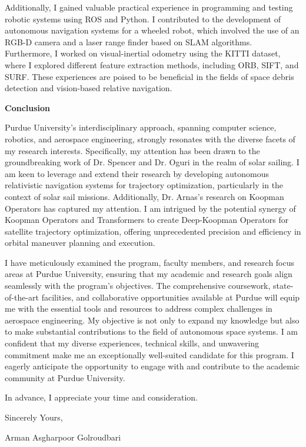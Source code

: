 \documentclass[a4,20pt]{article}
\begin{document}
\begin{large}
Additionally, I gained valuable practical experience in programming and testing robotic systems using ROS and Python. I contributed to the development of autonomous navigation systems for a wheeled robot, which involved the use of an RGB-D camera and a laser range finder based on SLAM algorithms. Furthermore, I worked on visual-inertial odometry using the KITTI dataset, where I explored different feature extraction methods, including ORB, SIFT, and SURF. These experiences are poised to be beneficial in the fields of space debris detection and vision-based relative navigation. 


\textbf{Conclusion}  \vspace{-0.35cm}

Purdue University's interdisciplinary approach, spanning computer science, robotics, and aerospace engineering, strongly resonates with the diverse facets of my research interests. Specifically, my attention has been drawn to the groundbreaking work of Dr. Spencer and Dr. Oguri in the realm of solar sailing. I am keen to leverage and extend their research by developing autonomous relativistic navigation systems for trajectory optimization, particularly in the context of solar sail missions. Additionally, Dr. Arnas's research on Koopman Operators has captured my attention. I am intrigued by the potential synergy of Koopman Operators and Transformers to create Deep-Koopman Operators for satellite trajectory optimization, offering unprecedented precision and efficiency in orbital maneuver planning and execution.

I have meticulously examined the program, faculty members, and research focus areas at Purdue University, ensuring that my academic and research goals align seamlessly with the program's objectives. The comprehensive coursework, state-of-the-art facilities, and collaborative opportunities available at Purdue will equip me with the essential tools and resources to address complex challenges in aerospace engineering. My objective is not only to expand my knowledge but also to make substantial contributions to the field of autonomous space systems. I am confident that my diverse experiences, technical skills, and unwavering commitment make me an exceptionally well-suited candidate for this program. I eagerly anticipate the opportunity to engage with and contribute to the academic community at Purdue University.

In advance, I appreciate your time and consideration. \par
\vspace{-0.4cm} Sincerely Yours, \par
\vspace{-0.4cm}Arman Asgharpoor Golroudbari \par
\end{large}
\end{document}
